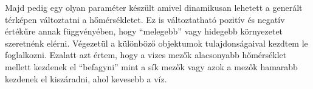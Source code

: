 \newpage
\noindent Majd pedig egy olyan paraméter készült amivel dinamikusan lehetett a generált térképen változtatni a hőmérsékletet. Ez is változtatható pozitív és negatív értékűre annak függvényében, hogy “melegebb” vagy hidegebb környezetet szeretnénk elérni.
\newline
\newline Végezetül a különböző objektumok tulajdonságaival kezdtem le foglalkozni. Ezalatt azt értem, hogy a vizes mezők alacsonyabb hőmérséklet mellett kezdenek el “befagyni” mint a sík mezők vagy azok a mezők hamarabb kezdenek el kiszáradni, ahol kevesebb a víz.

